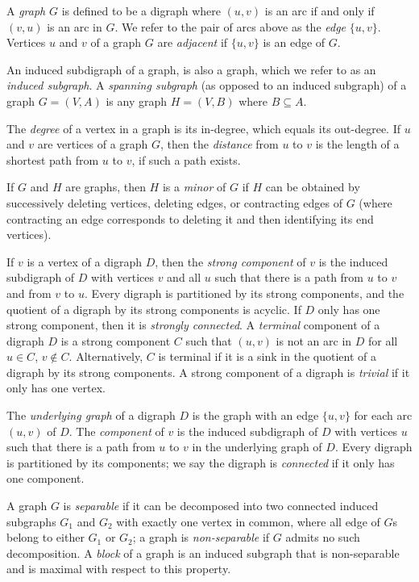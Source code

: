 \documentclass[ALCO,ThmDefs,Unicode,epreuves]{cedram}
\begin{document}
A \emph{graph} $G$ is defined to be a digraph where $(u, v)$ is an arc if and
only if $(v, u)$ is an arc in $G$. We refer to the pair of arcs above as the
\emph{edge} $\{u, v\}$. Vertices $u$ and $v$ of a graph $G$ are
\emph{adjacent} if $\{u, v\}$ is an edge of $G$. 

An induced subdigraph of a graph, is also a graph, which we refer to as an
\emph{induced subgraph}. A \emph{spanning subgraph} (as opposed to an
induced subgraph) of a graph $G = (V, A)$ is any graph $H = (V, B)$ where $B
\subseteq A$. 

The \emph{degree} of a vertex in a graph is its in-degree, which equals
its out-degree. If $u$ and $v$ are vertices of a graph $G$, then the
\emph{distance} from $u$ to $v$ is the length of a shortest path from $u$ to
$v$, if such a path exists.

If $G$ and $H$ are graphs, then $H$ is a \emph{minor} of $G$ if $H$ can be
obtained by successively deleting vertices, deleting edges, or contracting
edges of $G$ (where contracting an edge corresponds to deleting it and then
identifying its end vertices). 

If $v$ is a vertex of a digraph $D$, then the \emph{strong component} of $v$
is the induced subdigraph of $D$ with vertices $v$ and all $u$ such that there is a path
from $u$ to $v$ and from $v$ to $u$. Every digraph is partitioned by its strong components, and
the quotient of a digraph by its strong components is acyclic. If $D$ only has one strong component, then it is \emph{strongly connected}. A
\emph{terminal} component of a digraph $D$ is a strong component $C$ such
that $(u, v)$ is not an arc in $D$ for all $u \in C$, $v \notin C$.
Alternatively, $C$ is terminal if it is a sink in the quotient of a digraph by
its strong components. A strong component of a digraph is \emph{trivial} if
it only has one vertex. 

The \emph{underlying graph} of a digraph
$D$ is the graph with an edge $\{u,v\}$ for each arc $(u,v)$ of $D$. The
\emph{component} of $v$ is the induced subdigraph of $D$ with vertices $u$
such that there is a path from $u$ to $v$ in the underlying graph of $D$. Every digraph is partitioned by its components; we say the digraph is \emph{connected} if it only has one component.

A graph $G$ is \emph{separable} if it can be decomposed into two connected
induced subgraphs $G_1$ and $G_2$ with exactly one vertex in common, where all edge of $G$s belong to either $G_1$ or $G_2$; a graph is
\emph{non-separable} if $G$ admits no such decomposition. A \emph{block}
of a graph is an induced subgraph that is non-separable and is maximal with
respect to this property.
\end{document}
